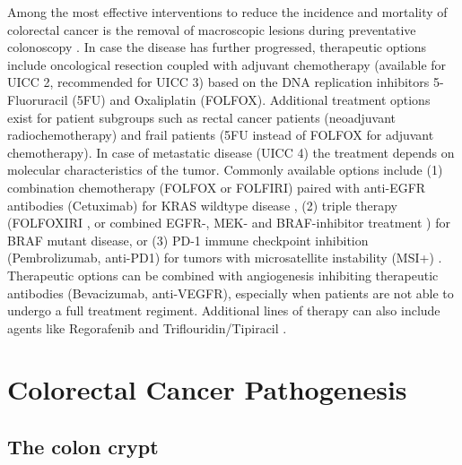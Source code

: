 \begin{flushleft}
Among the most effective interventions to reduce the incidence and mortality of colorectal cancer is the removal of macroscopic lesions during preventative colonoscopy \cite{Nishihara2013Long-TermEndoscopy}. In case the disease has further progressed, therapeutic options include oncological resection coupled with adjuvant chemotherapy (available for UICC 2, recommended for UICC 3) based on the DNA replication inhibitors 5-Fluoruracil (5FU) and Oxaliplatin (FOLFOX). Additional treatment options exist for patient subgroups such as rectal cancer patients (neoadjuvant radiochemotherapy) and frail patients (5FU instead of FOLFOX for adjuvant chemotherapy). In case of metastatic disease (UICC 4) the treatment depends on molecular characteristics of the tumor. Commonly available options include (1) combination chemotherapy (FOLFOX or FOLFIRI) paired with anti-EGFR antibodies (Cetuximab) for KRAS wildtype disease \cite{vancutsemESMOConsensusGuidelines2016a}, (2) triple therapy (FOLFOXIRI \cite{vancutsemESMOConsensusGuidelines2016a}, or combined EGFR-, MEK- and BRAF-inhibitor treatment \cite{kopetzEncorafenibBinimetinibCetuximab2019}) for BRAF mutant disease, or (3) PD-1 immune checkpoint inhibition (Pembrolizumab, anti-PD1) for tumors with microsatellite instability (MSI+) \cite{PembrolizumabMicrosatelliteInstabilityHigh}. Therapeutic options can be combined with angiogenesis inhibiting therapeutic antibodies (Bevacizumab, anti-VEGFR), especially when patients are not able to undergo a full treatment regiment. Additional lines of therapy can also include agents like Regorafenib and Triflouridin/Tipiracil \cite{vancutsemESMOConsensusGuidelines2016a}. \par

\section{Colorectal Cancer Pathogenesis}

\subsection{The colon crypt}


\end{flushleft}
